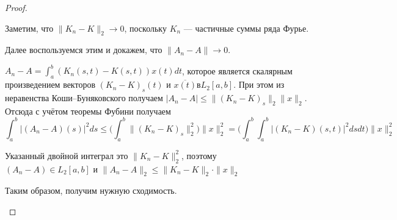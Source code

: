 \begin{proof}
\begin{enumerate}
        Заметим, что $\|K_n - K\|_{2} \to 0$, поскольку $K_n$ --- частичные суммы ряда Фурье.

        Далее воспользуемся этим и докажем, что $\|A_n - A\| \to 0$. 

        $A_n - A = \int_a^b (K_n(s, t) - K(s, t))x(t)dt$, которое является скалярным произведением векторов $(K_n - K)_s(t) \text{ и } \overline{x(t)} \text{в} L_2[a,b]$. При этом из неравенства Коши--Буняковского получаем $|A_n - A| \leq \|(K_n - K)_s\|_{2} \|x\|_{2}$. Отсюда с учётом теоремы Фубини получаем 
        $$\int_a^b|(A_n - A)(s)|^2 ds \leq \Big(\int_a^b \|(K_n - K)_s\|_{2}^2 \Big)\|x\|_2^2 = \Big(\int_a^b \int_a^b |(K_n - K)(s,t)|^2dsdt\Big)\|x\|_2^2$$

        Указанный двойной интеграл это $\|K_n - K\|_2^2$, поэтому $(A_n - A) \in L_2[a,b] \text{ и } \|A_n - A\|_2 \leq \|K_n - K\|_2 \cdot \|x\|_2$

        Таким образом, получим нужную сходимость.
    \end{enumerate}
\end{proof}